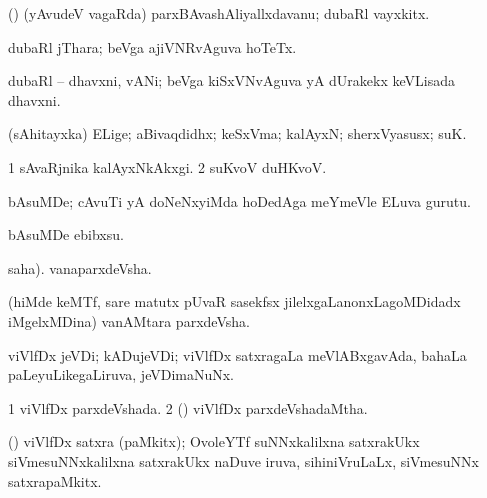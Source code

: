 {\bentry
{} 
\gl{\nA}
\expl{}
\bmng
(\ame) (yAvudeV vagaRda) parxBAvashAliyallxdavanu; dubaRl vayxkitx. 
\emng
\eentry

\bentry
{} 
\gl{\nA}
\expl{}
\bmng
{} 
\emng
\eentry

\bentry
{} 
\gl{\nA}
\expl{}
\bmng
dubaRl jThara; beVga ajiVNRvAguva hoTeTx. 
\emng
\eentry

\bentry
{} 
\gl{\nA}
\expl{}
\bmng
dubaRl -- dhavxni, vANi; beVga kiSxVNvAguva yA dUrakekx keVLisada dhavxni. 
\emng
\eentry

\bentry
{} 
\gl{\nA}
\expl{}
\bmng
(sAhitayxka) ELige; aBivaqdidhx; keSxVma; kalAyxN; sherxVyasusx; suK. 
\emng

\noindent 
\gl{\pagu}
\expl{}
\bmng
\bnum
\num{1}  sAvaRjnika kalAyxNkAkxgi. 
\num{2}  suKvoV duHKvoV. 
\enum
\emng
\eentry

\bentry
{} 
\gl{\nA}
\expl{}
\bmng
bAsuMDe; cAvuTi yA doNeNxyiMda hoDedAga meYmeVle ELuva gurutu. 
\emng
\eentry

\bentry
{} 
\gl{\sakirx}
\expl{}
\bmng
bAsuMDe ebibxsu. 
\emng
\eentry

\bentry
{} 
\gl{\nA}
\expl{}
\bmng
{} saha). vanaparxdeVsha. 
\emng

\noindent 
\gl{\pagu}
\expl{}
\bmng
{} (hiMde keMTf, sare matutx pUvaR sasekfsx jilelxgaLanonxLagoMDidadx iMgelxMDina) vanAMtara parxdeVsha. 
\emng
\eentry

\bentry
{} 
\gl{\nA}
\expl{}
\bmng
viVlfDx jeVDi; kADujeVDi; viVlfDx satxragaLa meVlABxgavAda, bahaLa paLeyuLikegaLiruva, jeVDimaNuNx. 
\emng
\eentry

\bentry
{} 
\gl{\gu}
\expl{}
\bmng
\bnum
\num{1} viVlfDx parxdeVshada. 
\num{2} (\BUvi) viVlfDx parxdeVshadaMtha. 
\enum
\emng
\eentry

\bentry
{} 
\gl{\nA}
\expl{}
\bmng
(\BUvi) viVlfDx satxra (paMkitx); OvoleYTf suNNxkalilxna satxrakUkx siVmesuNNxkalilxna satxrakUkx naDuve iruva, sihiniVruLaLx, siVmesuNNx satxrapaMkitx. 
\emng
\eentry

}
